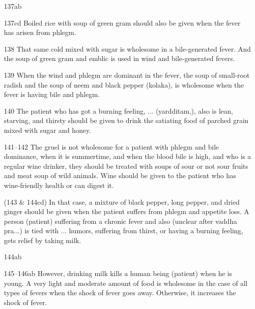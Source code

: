 \begin{translation}
   \item[137ab]  
    
    \item[137cd]  Boiled rice with soup of green gram should also be given when 
the
    fever has arisen from phlegm.
    
    \item[138]  That same cold mixed with sugar is wholesome in a 
bile-generated
    fever. And the soup of green gram and emblic is used in wind and
    bile-generated fevers.
    
    \item[139]  When the wind and phlegm are dominant in the fever, the soup of
    small-root radish and the soup of neem and black pepper (kolaka), is wholesome when the fever is having bile and phlegm.
    
    
    \item[140]  The patient who has got a burning feeling, ... (yardditam,), also is lean, starving, and thirsty should be given to drink
    the satiating food of parched grain mixed with sugar and honey.
    
    \item[141--142]  The gruel is not wholesome for a patient with phlegm and 
bile
    dominance, when it is summertime, and when the blood bile is high, and
    who is a regular wine drinker, they should be treated with soups of sour
    or not sour fruits and meat soup of wild animals. Wine should be given
    to the patient who has wine-friendly health or can digest it.
    
    
    (143 \& 144cd) In that case, a mixture of black pepper, long pepper, and
    dried ginger should be given when the patient suffers from phlegm and
    appetite loss. A person (patient) suffering from a chronic fever and
    also (unclear after vaddha pra...) is tied with ... humors, suffering
    from thirst, or having a burning feeling, gets relief by taking milk.
    
   \item[144ab]  
    
    \item[145--146ab]  However, drinking milk kills a human being (patient) 
when he
    is young. A very light and moderate amount of food is wholesome in the
    case of all types of fevers when the shock of fever goes away.
    Otherwise, it increases the shock of fever.
    

\end{translation}
